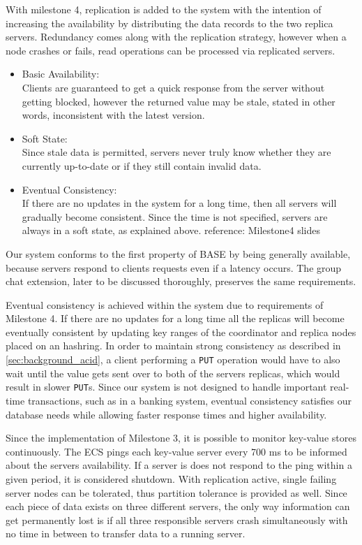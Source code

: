 With milestone 4, replication is added to the system with the intention of increasing the availability by distributing the data records to the two replica servers. Redundancy comes along with the replication strategy, however when a node crashes or fails, read operations can be processed via replicated servers.

\begin{itemize}
  \item Basic Availability:\\
 Clients are guaranteed to get a quick response from the server without getting blocked, however the returned value may be stale, stated in other words, inconsistent with the latest version.
  \item Soft State:\\
Since stale data is permitted, servers never truly know whether they are currently up-to-date or if they still contain invalid data.
  \item Eventual Consistency:\\
If there are no updates in the system for a long time, then all servers will gradually become consistent. Since the time is not specified, servers are always in a soft state, as explained above. reference: Milestone4 slides
\end{itemize}

Our system conforms to the first property of BASE by being generally available, because servers respond to clients requests even if a latency occurs. The group chat extension, later to be discussed thoroughly, preserves the same requirements.

Eventual consistency is achieved within the system due to requirements of Milestone 4. If there are no updates for a long time all the replicas will become eventually consistent by updating key ranges of the coordinator and replica nodes placed on an hashring. In order to maintain strong consistency as described in \ref{sec:background_acid}, a client performing a \texttt{PUT} operation would have to also wait until the value gets sent over to both of the servers replicas, which would result in slower \texttt{PUT}s. Since our system is not designed to handle important real-time transactions, such as in a banking system, eventual consistency satisfies our database needs while allowing faster response times and higher availability. 

Since the implementation of Milestone 3, it is possible to monitor key-value stores continuously. The ECS pings each key-value server every 700 ms to be informed about the servers availability. If a server is does not respond to the ping within a given period, it is considered shutdown. With replication active, single failing server nodes can be tolerated, thus partition tolerance is provided as well. Since each piece of data exists on three different servers, the only way information can get permanently lost is if all three responsible servers crash simultaneously with no time in between to transfer data to a running server.

